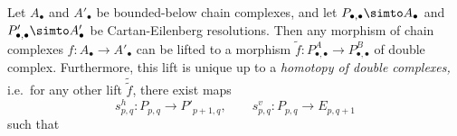 \documentclass[main.tex]{subfiles}
\begin{document}
\begin{proposition}
  \label{prop:can_lift_chain_maps_to_cartan_eilenberg_maps}
  Let $A_{\bullet}$ and $A'_{\bullet}$ be bounded-below chain complexes, and let $P_{\bullet,\bullet} \simto A_{\bullet}$ and $P'_{\bullet,\bullet} \simto A'_{\bullet}$ be Cartan-Eilenberg resolutions. Then any morphism of chain complexes $f\colon A_{\bullet} \to A'_{\bullet}$ can be lifted to a morphism $\tilde{f}\colon P^{A}_{\bullet,\bullet} \to P^{B}_{\bullet,\bullet}$ of double complex. Furthermore, this lift is unique up to a \emph{homotopy of double complexes,} i.e.\ for any other lift $\tilde{\tilde{f}}$, there exist maps
  \begin{equation*}
    s^{h}_{p,q}\colon P_{p,q} \to P'_{p+1,q},\qquad s^{v}_{p,q}\colon P_{p, q} \to E_{p, q+1}
  \end{equation*}
  such that
\end{proposition}
\end{document}
